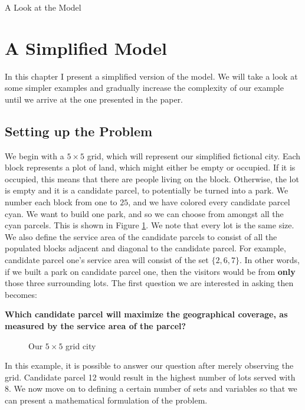 \documentclass[12pt]{pom_thesis}
\theoremstyle{definition}
\begin{document}
\begin{chapter}{A Look at the Model}
\section{A Simplified Model}
In this chapter I present a simplified version of the model. We will take a look at some simpler examples and gradually increase the complexity of our example until we arrive at the one presented in the paper. 

\subsection{Setting up the Problem}

We begin with a $5\times5$ grid, which will represent our simplified fictional city. Each block represents a plot of land, which might either be empty or occupied. If it is occupied, this means that there are people living on the block. Otherwise, the lot is empty and it is a candidate parcel, to potentially be turned into a park. We number each block from one to $25$, and we have colored every candidate parcel cyan. We want to build one park, and so we can choose from amongst all the cyan parcels. This is shown in Figure \ref{fig:grid1}. We note that every lot is the same size. We also define the service area of the candidate parcels to consist of all the populated blocks adjacent and diagonal to the candidate parcel. For example, candidate parcel one's service area will consist of the set $\{2,6,7\}$. In other words, if we built a park on candidate parcel one, then the visitors would be from \textbf{only} those three surrounding lots. The first question we are interested in asking then becomes: 
\begin{center}
\textbf{Which candidate parcel will maximize the geographical coverage, as measured by the service area of the parcel?}
\end{center}
\begin{figure}
 \centering
 \caption{Our $5\times 5$ grid city}
 \label{fig:grid1}
\end{figure}
In this example, it is possible to answer our question after merely observing the grid. Candidate parcel 12 would result in the highest number of lots served with 8. We now move on to defining a certain number of sets and variables so that we can present a mathematical formulation of the problem. \newline 
	

\end{chapter}
\end{document}
